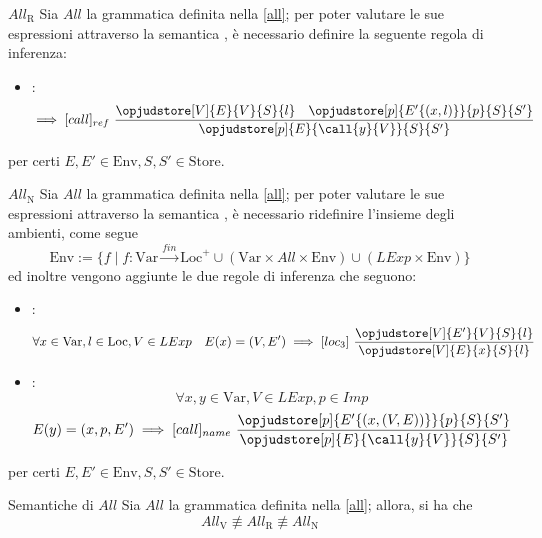 \documentclass[a4paper, 12pt]{report}
\begin{document}
    \begin{framedprop}[label={all r}]{$All_\mathrm{R}$}
        Sia $All$ la grammatica definita nella \cref{all}; per poter valutare le sue espressioni attraverso la semantica , è necessario definire la seguente regola di inferenza: 

        \begin{itemize}
            \item {}:  $$\implies [call]_{ref} \ \dfrac{\opjudstore[V]{E}{V}{S}{l} \quad \opjudstore[p]{E'\{(x,l)\}}{p}{S}{S'}}{\opjudstore[p]{E}{\call{y}{V}}{S}{S'}}$$
        \end{itemize}

        per certi $E,E' \in \mathrm{Env}, S,S' \in \mathrm{Store}$.
    \end{framedprop}

    \begin{framedprop}[label={all n}]{$All_\mathrm{N}$}
        Sia $All$ la grammatica definita nella \cref{all}; per poter valutare le sue espressioni attraverso la semantica , è necessario ridefinire l'insieme degli ambienti, come segue $$\mathrm{Env} := \{f \mid f : \mathrm{Var} \xrightarrow{fin} \mathrm{Loc}^+ \cup (\mathrm{Var} \times All \times \mathrm{Env}) \cup (LExp \times \mathrm{Env})\}$$ ed inoltre vengono aggiunte le due regole di inferenza che seguono:

        \begin{itemize}
            \item {}: $$\forall x \in \mathrm{Var}, l \in \mathrm{Loc}, V \in LExp \quad E(x) = (V, E') \implies [loc_3] \ \dfrac{\opjudstore[V]{E'}{V}{S}{l}}{\opjudstore[V]{E}{x}{S}{l}}$$
            \item {}: $$\forall x,y \in \mathrm{Var}, V \in LExp, p \in Imp$$ $$E(y) = (x, p, E') \implies [call]_{name} \ \dfrac{\opjudstore[p]{E'\{(x,(V,E))\}}{p}{S}{S'}}{\opjudstore[p]{E}{\call{y}{V}}{S}{S'}}$$
        \end{itemize}

        per certi $E, E' \in \mathrm{Env}, S, S' \in \mathrm{Store}$.
    \end{framedprop}

    \begin{framedlem}{Semantiche di $All$}
        Sia $All$ la grammatica definita nella \cref{all}; allora, si ha che $$All_\mathrm{V} \not\equiv All_\mathrm{R} \not\equiv All_\mathrm{N}$$
    \end{framedlem}
    
\end{document}
